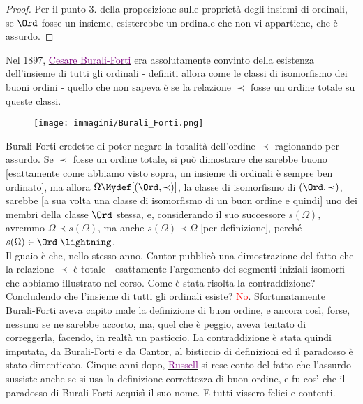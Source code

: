 \documentclass[11pt]{scrartcl}
\begin{document}
\begin{proof}
	Per il punto 3. della proposizione sulle proprietà degli insiemi di ordinali, se $\Ord$ fosse un insieme, esisterebbe un ordinale che non vi appartiene, che è assurdo.
\end{proof}


\pagebreak
\begin{note}
	Nel 1897, \href{https://it.wikipedia.org/wiki/Cesare_Burali-Forti}{\textcolor{purple}{Cesare Burali-Forti}} era assolutamente convinto della esistenza dell'insieme
	di tutti gli ordinali - definiti allora come le classi di isomorfismo dei buoni ordini - quello che non sapeva è se la relazione $\prec$ fosse un ordine totale su queste classi.
	\begin{figure}[H]
		\centering
		\texttt{[image: immagini/Burali\_Forti.png]}
	\end{figure}
	Burali-Forti credette di poter negare la totalità dell'ordine $\prec$ ragionando per assurdo. Se $\prec$ fosse un ordine totale, si può dimostrare che sarebbe buono [esattamente come abbiamo visto sopra, un insieme di ordinali è sempre ben ordinato], ma 
	allora $\Omega \Mydef [(\Ord,\prec)]$, la classe di isomorfismo di $(\Ord,\prec)$, sarebbe [a sua volta una classe di isomorfismo di un buon ordine e quindi] uno dei membri della classe $\Ord$ stessa, e, considerando il suo successore $s(\Omega)$,
	avremmo $\Omega \prec s(\Omega)$, ma anche $s(\Omega) \prec \Omega$ [per definizione], perché $s(\Omega) \in \Ord\;\lightning$.\\
	Il guaio è che, nello stesso anno, Cantor pubblicò una dimostrazione del fatto che la relazione $\prec$ è totale - esattamente l'argomento dei segmenti iniziali isomorfi che abbiamo illustrato 
	nel corso. Come è stata risolta la contraddizione? Concludendo che l'insieme di tutti gli ordinali esiste? \textcolor{red}{No}. Sfortunatamente Burali-Forti 
	aveva capito male la definizione di buon ordine, e ancora così, forse, nessuno se ne sarebbe accorto, ma, quel che è peggio, aveva tentato di correggerla, facendo, in realtà un pasticcio.
	La contraddizione è stata quindi imputata, da Burali-Forti e da Cantor, al bisticcio di definizioni ed il paradosso è stato dimenticato. Cinque anni dopo, \href{https://en.wikipedia.org/wiki/Bertrand_Russell}{\textcolor{purple}{Russell}}
	si rese conto del fatto che l'assurdo sussiste anche se si usa la definizione correttezza di buon ordine, e fu così che il paradosso di Burali-Forti acquisì il suo nome. E tutti vissero felici e contenti.
\end{note}
\end{document}
